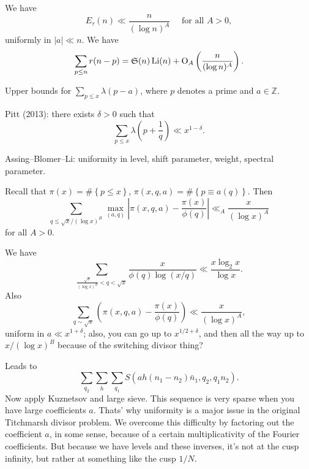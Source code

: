 \documentclass[reqno]{amsart} 
\begin{document}
\begin{theorem}
  We have
  \begin{equation*}
    E_\tau (n) \ll \frac{n}{ (\log n )^A }
    \quad \text{ for all } A > 0,
  \end{equation*}
  uniformly in $\lvert a \rvert \ll n$.  We have
  \begin{equation*}
    \sum_{p \leq n} r (n - p) =
    \mathfrak{S} (n) \operatorname{Li}(n) + \operatorname{O}_A \left( \frac{n}{ (\log n)^A } \right).
  \end{equation*}
\end{theorem}

Upper bounds for $\sum_{p \leq x} \lambda (p - a)$, where $p$ denotes a prime and $a \in \mathbb{Z} $.

Pitt (2013): there exists $\delta > 0$ such that
\begin{equation*}
\sum_{p \leq x } \lambda \left(p + \frac{1}{q}\right) \ll x^{1 - \delta}.
\end{equation*}

Assing--Blomer--Li: uniformity in level, shift parameter, weight, spectral parameter.

Recall that $\pi (x) = \# \left\{ p \leq x \right\}$, $\pi (x, q, a) = \# \left\{ p \equiv a(q) \right\}$.  Then
\begin{equation*}
  \sum_{q \leq \sqrt{x} / (\log x)^B }
  \max_{(a,q)}
  \left\lvert \pi (x, q, a) - \frac{\pi (x) }{\phi (q) } \right\rvert
  \ll_A \frac{x}{ (\log x)^A }
\end{equation*}
for all $A > 0$.

We have
\begin{equation*}
  \sum_{\frac{\sqrt{x}}{ (\log x)^B } < q < \sqrt{x}}
  \frac{x}{\phi (q) \log (x/q)}
  \ll \frac{x \log_2 x }{\log x}.
\end{equation*}
Also
\begin{equation*}
  \sum_{q \sim \sqrt{x}}
  \left( \pi (x, q, a) - \frac{\pi (x) }{ \phi (q) } \right)
  \ll \frac{x}{ (\log x)^A },
\end{equation*}
uniform in $a \ll x^{1 + \delta }$; also, you can go up to $x^{1/2 + \delta }$, and then all the way up to $x / (\log x )^B $ because of the switching divisor thing?

Leads to
\begin{equation*}
  \sum_{q_2 } \sum_h \sum_{q_1 }
  S \left( a h (n_1 - n_2 ) \bar{n}_1, q_2, q_1 n_2  \right).
\end{equation*}
Now apply Kuznetsov and large sieve.  This sequence is very sparse when you have large coefficients $a$.  Thats' why uniformity is a major issue in the original Titchmarsh divisor problem.  We overcome this difficulty by factoring out the coefficient $a$, in some sense, because of a certain multiplicativity of the Fourier coefficients.  But because we have levels and these inverses, it's not at the cusp infinity, but rather at something like the cusp $1/N$.
\end{document}
